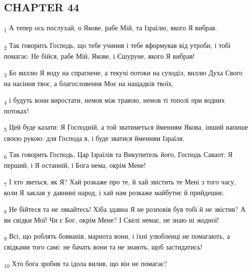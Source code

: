 \subsection{CHAPTER 44}
\begin{tcolorbox}
\textsubscript{1} А тепер ось послухай, о Якове, рабе Мій, та Ізраїлю, якого Я вибрав.
\end{tcolorbox}
\begin{tcolorbox}
\textsubscript{2} Так говорить Господь, що тебе учинив і тебе вформував від утроби, і тобі помагає: Не бійся, рабе Мій, Якове, і Єшуруне, якого Я вибрав!
\end{tcolorbox}
\begin{tcolorbox}
\textsubscript{3} Бо виллю Я воду на спрагнене, а текучі потоки на суходіл, виллю Духа Свого на насіння твоє, а благословення Моє на нащадків твоїх,
\end{tcolorbox}
\begin{tcolorbox}
\textsubscript{4} і будуть вони виростати, немов між травою, немов ті тополі при водних потоках!
\end{tcolorbox}
\begin{tcolorbox}
\textsubscript{5} Цей буде казати: Я Господній, а той зватиметься йменням Якова, інший напише своєю рукою: для Господа я, і буде зватися йменням Ізраїля.
\end{tcolorbox}
\begin{tcolorbox}
\textsubscript{6} Так говорить Господь, Цар Ізраїлів та Викупитель його, Господь Саваот: Я перший, і Я останній, і Бога нема, окрім Мене!
\end{tcolorbox}
\begin{tcolorbox}
\textsubscript{7} І хто зветься, як Я? Хай розкаже про те, й хай звістить те Мені з того часу, коли Я заклав у давнині народ, і хай нам розкаже майбутнє й прийдешнє.
\end{tcolorbox}
\begin{tcolorbox}
\textsubscript{8} Не бійтеся та не лякайтесь! Хіба здавна Я не розповів був тобі й не звістив? А ви свідки Мої! Чи є Бог, окрім Мене? І Скелі немає, не знаю ні жодної!
\end{tcolorbox}
\begin{tcolorbox}
\textsubscript{9} Всі, що роблять бовванів, марнота вони, і їхні улюбленці не помагають, а свідками того самі: не бачать вони та не знають, щоб застидатись!
\end{tcolorbox}
\begin{tcolorbox}
\textsubscript{10} Хто бога зробив та ідола вилив, що він не помагає?
\end{tcolorbox}

